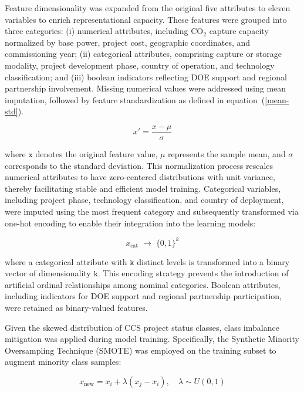 \documentclass[conference]{IEEEtran}
\begin{document}
Feature dimensionality was expanded from the original five attributes to eleven variables to enrich representational capacity. These features were grouped into three categories: (i) numerical attributes, including CO$_2$ capture capacity normalized by base power, project cost, geographic coordinates, and commissioning year; (ii) categorical attributes, comprising capture or storage modality, project development phase, country of operation, and technology classification; and (iii) boolean indicators reflecting DOE support and regional partnership involvement. Missing numerical values were addressed using mean imputation, followed by feature standardization as defined in equation~(\ref{mean-std}).


\begin{equation}
    x' = \frac{x - \mu}{\sigma}
\label{mean-std}
\end{equation}

where $\mathtt{x}$ denotes the original feature value, $\mathtt{\mu}$ represents the sample mean, and $\mathtt{\sigma}$ corresponds to the standard deviation. This normalization process rescales numerical attributes to have zero-centered distributions with unit variance, thereby facilitating stable and efficient model training. Categorical variables, including project phase, technology classification, and country of deployment, were imputed using the most frequent category and subsequently transformed via one-hot encoding to enable their integration into the learning models:


\begin{equation}
    x_{\text{cat}} \;\rightarrow\; \{0,1\}^k
\end{equation}

where a categorical attribute with $\mathtt{k}$ distinct levels is transformed into a binary vector of dimensionality $\mathtt{k}$. This encoding strategy prevents the introduction of artificial ordinal relationships among nominal categories. Boolean attributes, including indicators for DOE support and regional partnership participation, were retained as binary-valued features.

Given the skewed distribution of CCS project status classes, class imbalance mitigation was applied during model training. Specifically, the Synthetic Minority Oversampling Technique (SMOTE) was employed on the training subset to augment minority class samples:


\begin{equation}
    x_{\text{new}} = x_i + \lambda (x_j - x_i), \quad \lambda \sim U(0,1)
\end{equation}
\end{document}
